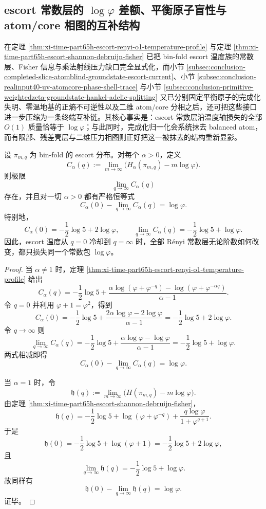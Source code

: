 \subsection{escort 常数层的 \texorpdfstring{$\log\varphi$}{log phi} 差额、平衡原子盲性与 atom/core 相图的互补结构}\label{subsec:conclusion-escort-atomcore-completion-groundstate-complementarity}
在定理 \ref{thm:xi-time-part65h-escort-renyi-o1-temperature-profile} 与定理 \ref{thm:xi-time-part65h-escort-shannon-debruijn-fisher} 已把 bin-fold escort 温度族的常数层、Fisher 信息与乘法射线压力缺口完全显式化，而小节 \ref{subsec:conclusion-completed-slice-atomblind-groundstate-escort-current}、小节 \ref{subsec:conclusion-realinput40-uv-atomcore-phase-shell-trace} 与小节 \ref{subsec:conclusion-primitive-weightedzeta-groundstate-hankel-adelic-splitting} 又已分别固定平衡原子的完成化失明、零温地基的正熵不可逆性以及二维 atom/core 分相之后，还可把这些接口进一步压缩为一条终端互补链。其核心事实是：escort 常数层沿温度轴损失的全部 \(O(1)\) 质量恰等于 \(\log\varphi\)；与此同时，完成化归一化会系统抹去 balanced atom，而有限部、残差壳层与二维压力相图则正好把这一被抹去的结构重新显影。

\begin{theorem}\label{thm:conclusion-escort-constant-layer-universal-logphi-gap}
设 \(\pi_{m,q}\) 为 bin-fold 的 escort 分布。对每个 \(\alpha>0\)，定义
\[
C_\alpha(q):=
\lim_{m\to\infty}\bigl(H_\alpha(\pi_{m,q})-m\log\varphi\bigr).
\]
则极限
\[
\lim_{q\to\infty}C_\alpha(q)
\]
存在，并且对一切 \(\alpha>0\) 都有严格恒等式
\[
\boxed{\;
C_\alpha(0)-\lim_{q\to\infty}C_\alpha(q)=\log\varphi.\;}
\]
特别地，
\[
C_\alpha(0)=-\frac12\log 5+2\log\varphi,
\qquad
\lim_{q\to\infty}C_\alpha(q)=-\frac12\log 5+\log\varphi.
\]
因此，escort 温度从 \(q=0\) 冷却到 \(q=\infty\) 时，全部 Rényi 常数层无论阶数如何改变，都只损失同一个常数包 \(\log\varphi\)。
\end{theorem}
\begin{proof}
当 \(\alpha\neq 1\) 时，定理 \ref{thm:xi-time-part65h-escort-renyi-o1-temperature-profile} 给出
\[
C_\alpha(q)
=
-\frac12\log 5
+
\frac{\alpha\log(\varphi+\varphi^{-q})-\log(\varphi+\varphi^{-\alpha q})}{\alpha-1}.
\]
令 \(q=0\) 并利用 \(\varphi+1=\varphi^2\)，得到
\[
C_\alpha(0)
=
-\frac12\log 5
+
\frac{2\alpha\log\varphi-2\log\varphi}{\alpha-1}
=
-\frac12\log 5+2\log\varphi.
\]
令 \(q\to\infty\) 则
\[
\lim_{q\to\infty}C_\alpha(q)
=
-\frac12\log 5
+
\frac{\alpha\log\varphi-\log\varphi}{\alpha-1}
=
-\frac12\log 5+\log\varphi.
\]
两式相减即得
\[
C_\alpha(0)-\lim_{q\to\infty}C_\alpha(q)=\log\varphi.
\]

当 \(\alpha=1\) 时，令
\[
\mathfrak h(q):=
\lim_{m\to\infty}\bigl(H(\pi_{m,q})-m\log\varphi\bigr).
\]
由定理 \ref{thm:xi-time-part65h-escort-shannon-debruijn-fisher}，
\[
\mathfrak h(q)
=
-\frac12\log 5+\log(\varphi+\varphi^{-q})
+\frac{q\log\varphi}{1+\varphi^{q+1}}.
\]
于是
\[
\mathfrak h(0)=-\frac12\log 5+\log(\varphi+1)=-\frac12\log 5+2\log\varphi,
\]
且
\[
\lim_{q\to\infty}\mathfrak h(q)=-\frac12\log 5+\log\varphi.
\]
故同样有
\[
\mathfrak h(0)-\lim_{q\to\infty}\mathfrak h(q)=\log\varphi.
\]
证毕。
\end{proof}

